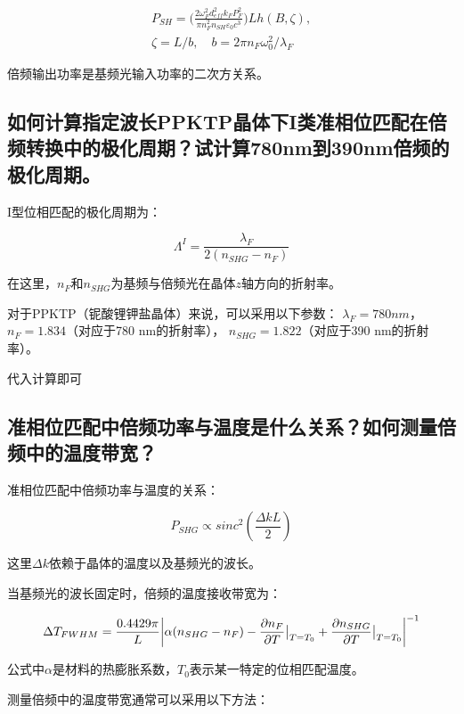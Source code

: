 \documentclass[a4paper,UTF8]{ctexart}
\begin{document}
\begin{align}
P_{SH}=\Bigg(\frac{2\omega_{F}^{2}d_{eff}^{2}k_{F}P_{F}^{2}}{\pi n_{F}^{2}n_{SH}\varepsilon_{0}c^{3}}\Bigg)Lh(B,\zeta), \\
\zeta=L/b,\quad b=2\pi n_F\omega_0^2/\lambda_F 
\end{align}

倍频输出功率是基频光输入功率的二次方关系。

\subsection{如何计算指定波长PPKTP晶体下I类准相位匹配在倍频转换中的极化周期？试计算780nm到390nm倍频的极化周期。}

I型位相匹配的极化周期为：

\begin{equation}
    \Lambda^{I} = \frac{\lambda_F}{2(n_{SHG}-n_{F})}
\end{equation}

在这里，$n_F$和$n_{SHG}$为基频与倍频光在晶体$z$轴方向的折射率。

对于PPKTP（铌酸锂钾盐晶体）来说，可以采用以下参数：
$λ_{F} = 780 nm$，
$n_{F} = 1.834$（对应于780 nm的折射率），
$n_{SHG} = 1.822$（对应于390 nm的折射率）。

代入计算即可

\subsection{准相位匹配中倍频功率与温度是什么关系？如何测量倍频中的温度带宽？}

准相位匹配中倍频功率与温度的关系：

\begin{equation}
    P_{SHG} \propto sinc^{2}(\frac{\Delta k L}{2})
\end{equation}

这里$\Delta k$依赖于晶体的温度以及基频光的波长。

当基频光的波长固定时，倍频的温度接收带宽为：

\begin{equation}
    \Delta T_{FWHM} = \frac{0.4429\pi}{L}\abs{\alpha(n_{SHG}-n_{F})- \frac{\partial n_F}{\partial T}\big{|}_{T=T_0} + \frac{\partial n_{SHG}}{\partial T}\big{|}_{T=T_0}}^{-1}
\end{equation}

公式中$\alpha$是材料的热膨胀系数，$T_0$表示某一特定的位相匹配温度。

测量倍频中的温度带宽通常可以采用以下方法：\
\end{document}
